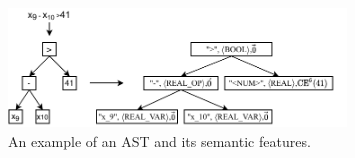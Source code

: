 \begin{figure}[t]
  \centering
  \includegraphics[width=0.8\textwidth]{figures/doping-ast-exp.pdf}
  \caption{An example of an AST and its semantic features.}
  \label{fig:ast_example}
\end{figure}

